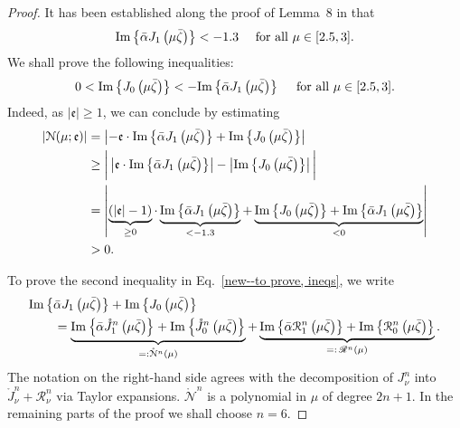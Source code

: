 \documentclass[11pt,a4paper,english,reqno]{amsart}
\theoremstyle{plain}
\newcommand{\1}{\mathbbm{1}}
\begin{document}
\begin{proof}
It has been established along the proof of Lemma~8 in \cite{boedihardjo2021expected} that
\begin{align*}
{\rm Im} \left\{\bar{\alpha} J_{1}\left(\mu \bar{\zeta}\right)\right\} < - 1.3\quad\text{ for all } \mu \in [2.5,3].
\end{align*}
We shall prove the following inequalities:
\begin{align}\label{new--to prove, ineqs}
0<{\rm Im} \left\{J_{0}\left(\mu \bar{\zeta}\right)\right\} < -{\rm Im} \left\{\bar{\alpha} J_{1}\left(\mu \bar{\zeta}\right)\right\} \quad\text{ for all } \mu \in [2.5,3].
\end{align}
Indeed, as $|\mathfrak{e}|\geq 1$, we can conclude by estimating
\begin{align*}
\left|\mathcal{N}(\mu;\mathfrak{e})\right|&= \left|-\mathfrak{e} \cdot {\rm Im} \left\{\bar{\alpha} J_{1}\left(\mu \bar{\zeta}\right)\right\} + {\rm Im} \left\{J_{0}\left(\mu \bar{\zeta}\right)\right\}\right|\\
& \geq \bigg|\left|\mathfrak{e} \cdot {\rm Im} \left\{\bar{\alpha} J_{1}\left(\mu \bar{\zeta}\right)\right\}\right| - \left| {\rm Im} \left\{J_{0}\left(\mu \bar{\zeta}\right)\right\}\right|\bigg|\\
&= \left|\underbrace{\left(\left|\mathfrak{e}\right|-1\right)}_{\geq 0} \cdot\underbrace{{\rm Im} \left\{\bar{\alpha} J_{1}\left(\mu \bar{\zeta}\right)\right\}}_{<-1.3}+ \underbrace{{\rm Im} \left\{J_{0}\left(\mu \bar{\zeta}\right)\right\}+{\rm Im} \left\{\bar{\alpha} J_{1}\left(\mu \bar{\zeta}\right)\right\}}_{<0} \right|\\
&>0.
\end{align*}



To prove the second inequality in Eq.~\eqref{new--to prove, ineqs}, we write
\begin{align*}
&{\rm Im} \left\{\bar{\alpha} J_{1}\left(\mu \bar{\zeta}\right)\right\} +  {\rm Im} \left\{J_{0}\left(\mu \bar{\zeta}\right)\right\}\\
&\qquad = \underbrace{{\rm Im} \left\{\bar{\alpha} \mathring{J}^{n}_{1}\left(\mu \bar{\zeta}\right)\right\} +  {\rm Im} \left\{\mathring{J}^{n}_{0}\left(\mu \bar{\zeta}\right)\right\} }_{=:\mathring{\mathcal{N}}^{n}(\mu)}  + \underbrace{{\rm Im} \left\{\bar{\alpha} \mathcal{R}^{n}_{1}\left(\mu \bar{\zeta}\right)\right\} +  {\rm Im} \left\{\mathcal{R}^{n}_{0}\left(\mu \bar{\zeta}\right)\right\} }_{=:\,{\mathscr{R}}^{n}(\mu)}.
\end{align*}
The notation on the right-hand side agrees with the decomposition of $J_{\nu}^{n}$ into $\mathring{J}^n_{\nu}+\mathscr{R}_\nu^n$ via Taylor expansions. $\mathring{\mathcal{N}}^{n}$ is a polynomial in $\mu$ of degree $2n+1$. In the remaining parts of the proof we shall choose $n = 6$. 




\end{proof}
\end{document}
